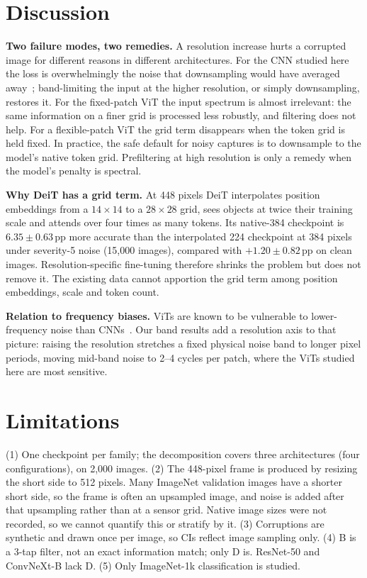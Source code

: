 \documentclass[conference]{IEEEtran}
\newcommand{\pp}{\,\mathrm{pp}}
\begin{document}
\section{Discussion}
\textbf{Two failure modes, two remedies.} A resolution increase hurts a corrupted image for different reasons in different architectures. For the CNN studied here the loss is overwhelmingly the noise that downsampling would have averaged away~\cite{kim2025noise}; band-limiting the input at the higher resolution, or simply downsampling, restores it. For the fixed-patch ViT the input spectrum is almost irrelevant: the same information on a finer grid is processed less robustly, and filtering does not help. For a flexible-patch ViT the grid term disappears when the token grid is held fixed. In practice, the safe default for noisy captures is to downsample to the model's native token grid. Prefiltering at high resolution is only a remedy when the model's penalty is spectral.

\textbf{Why DeiT has a grid term.} At 448 pixels DeiT interpolates position embeddings from a $14\times14$ to a $28\times28$ grid, sees objects at twice their training scale and attends over four times as many tokens. Its native-384 checkpoint is $6.35\pm0.63\pp$ more accurate than the interpolated 224 checkpoint at 384 pixels under severity-5 noise (15,000 images), compared with $+1.20\pm0.82\pp$ on clean images. Resolution-specific fine-tuning therefore shrinks the problem but does not remove it. The existing data cannot apportion the grid term among position embeddings, scale and token count.

\textbf{Relation to frequency biases.} ViTs are known to be vulnerable to lower-frequency noise than CNNs~\cite{park2022how}. Our band results add a resolution axis to that picture: raising the resolution stretches a fixed physical noise band to longer pixel periods, moving mid-band noise to 2--4 cycles per patch, where the ViTs studied here are most sensitive.

\section{Limitations}
\label{sec:limits}
(1) One checkpoint per family; the decomposition covers three architectures (four configurations), on 2,000 images. (2) The 448-pixel frame is produced by resizing the short side to 512 pixels. Many ImageNet validation images have a shorter short side, so the frame is often an upsampled image, and noise is added after that upsampling rather than at a sensor grid. Native image sizes were not recorded, so we cannot quantify this or stratify by it. (3) Corruptions are synthetic and drawn once per image, so CIs reflect image sampling only. (4) B is a 3-tap filter, not an exact information match; only D is. ResNet-50 and ConvNeXt-B lack D. (5) Only ImageNet-1k classification is studied.
\end{document}
